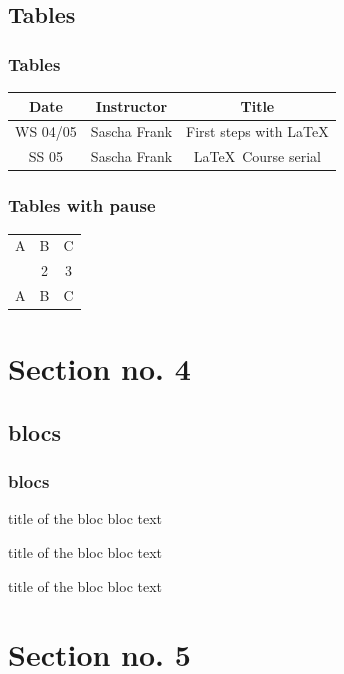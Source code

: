 \documentclass{beamer}
\begin{document}
\subsection{Tables}

\begin{frame}\frametitle{Tables}
  \begin{tabular}{|c|c|c|}
    \hline
    \textbf{Date} & \textbf{Instructor} & \textbf{Title} \\
    \hline
    WS 04/05 & Sascha Frank & First steps with  \LaTeX  \\
    \hline
    SS 05 & Sascha Frank & \LaTeX \ Course serial \\
    \hline
  \end{tabular}
\end{frame}

\begin{frame}\frametitle{Tables with pause}
  \begin{tabular}{c c c}
    A & B & C \\
    \pause
    1 & 2 & 3 \\
    \pause
    A & B & C \\
  \end{tabular}
\end{frame}


\section{Section no. 4}

\subsection{blocs}

\begin{frame}\frametitle{blocs}
  \begin{block}{title of the bloc}
    bloc text
  \end{block}
  \begin{exampleblock}{title of the bloc}
    bloc text
  \end{exampleblock}
  \begin{alertblock}{title of the bloc}
    bloc text
  \end{alertblock}
\end{frame}


\section{Section no. 5}
\end{document}
